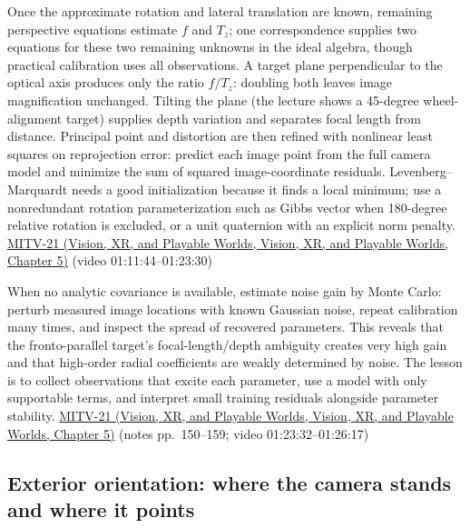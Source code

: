 Once the approximate rotation and lateral translation are known, remaining perspective equations estimate \(f\) and \(T_z\); one correspondence supplies two equations for these two remaining unknowns in the ideal algebra, though practical calibration uses all observations. A target plane perpendicular to the optical axis produces only the ratio \(f/T_z\): doubling both leaves image magnification unchanged. Tilting the plane (the lecture shows a 45-degree wheel-alignment target) supplies depth variation and separates focal length from distance. Principal point and distortion are then refined with nonlinear least squares on reprojection error: predict each image point from the full camera model and minimize the sum of squared image-coordinate residuals. Levenberg--Marquardt needs a good initialization because it finds a local minimum; use a nonredundant rotation parameterization such as Gibbs vector when 180-degree relative rotation is excluded, or a unit quaternion with an explicit norm penalty. \href{../07-Vision-XR-and-Playable-Worlds/main.pdf\#nameddest=04-visual-computing-ii-ch036-mitv-21---relative-orientation-binocular-stereo-structure-quadrics-calibration-reprojection}{MITV-21 (Vision, XR, and Playable Worlds, Vision, XR, and Playable Worlds, Chapter 5)} (video 01:11:44--01:23:30)

When no analytic covariance is available, estimate noise gain by Monte Carlo: perturb measured image locations with known Gaussian noise, repeat calibration many times, and inspect the spread of recovered parameters. This reveals that the fronto-parallel target's focal-length/depth ambiguity creates very high gain and that high-order radial coefficients are weakly determined by noise. The lesson is to collect observations that excite each parameter, use a model with only supportable terms, and interpret small training residuals alongside parameter stability. \href{../07-Vision-XR-and-Playable-Worlds/main.pdf\#nameddest=04-visual-computing-ii-ch036-mitv-21---relative-orientation-binocular-stereo-structure-quadrics-calibration-reprojection}{MITV-21 (Vision, XR, and Playable Worlds, Vision, XR, and Playable Worlds, Chapter 5)} (notes pp.~150--159; video 01:23:32--01:26:17)

\subsection{Exterior orientation: where the camera stands and where it points}\label{03-visual-computing-i-ch003-exterior-orientation-where-the-camera-stands-and-where-it-points}

